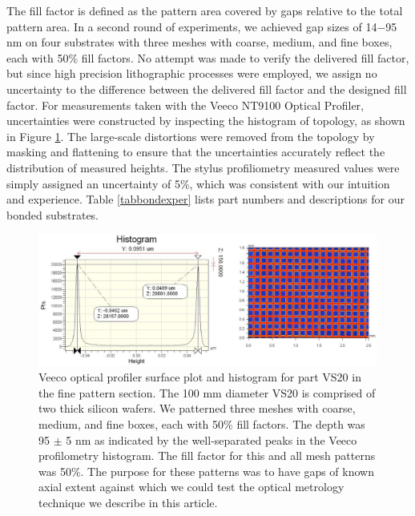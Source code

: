 \documentclass[osajnl,preprint,showpacs,superscriptaddress,12pt]{revtex4-1} %
\begin{document}
The fill factor is defined as the pattern area covered by gaps relative to the total pattern area.  In a second round of experiments, we achieved gap sizes of 14$-$95 nm on four substrates with three meshes with coarse, medium, and fine boxes, each with 50\% fill factors.  No attempt was made to verify the delivered fill factor, but since high precision lithographic processes were employed, we assign no uncertainty to the difference between the delivered fill factor and the designed fill factor.  For measurements taken with the Veeco NT9100 Optical Profiler, uncertainties were constructed by inspecting the histogram of topology, as shown in Figure \ref{figVS20pattern}.  The large-scale distortions were removed from the topology by masking and flattening to ensure that the uncertainties accurately reflect the distribution of measured heights.  The stylus profiliometry measured values were simply assigned an uncertainty of 5\%, which was consistent with our intuition and experience.  Table \ref{tabbondexper} lists part numbers and descriptions for our bonded substrates.  

\begin{figure}[htbp]
\centerline{\includegraphics[width=1.0\columnwidth]{figs/VS20fineGapCrop.pdf}}
\caption{
\label{figVS20pattern}
Veeco optical profiler surface plot and histogram for part VS20 in the fine pattern section.  The 100 mm diameter VS20 is comprised of two thick silicon wafers.  We patterned three meshes with coarse, medium, and fine boxes, each with 50\% fill factors.  The depth was 95 $\pm$ 5 nm as indicated by the well-separated peaks in the Veeco profilometry histogram.  The fill factor for this and all mesh patterns was 50\%.  The purpose for these patterns was to have gaps of known axial extent against which we could test the optical metrology technique we describe in this article.}
\end{figure}




\end{document}
